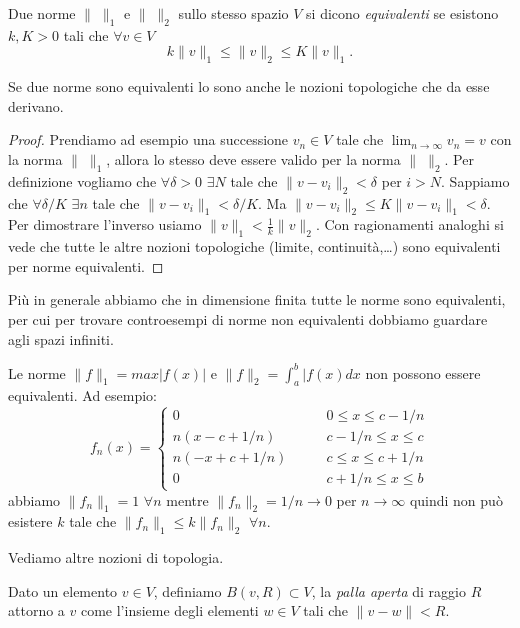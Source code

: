 \begin{definition}
Due norme $\|\;\|_1$ e $\|\;\|_2$ sullo stesso spazio $V$ si dicono \emph{equivalenti}
se esistono $k, K > 0$ tali che $\forall v \in V$ 
\[
	k\|v\|_1\leq \|v\|_2\leq K\|v\|_1
.\]
\end{definition}

\begin{lemma}
Se due norme sono equivalenti lo sono anche le nozioni topologiche che da
esse derivano.
\end{lemma}
\begin{proof}
Prendiamo ad esempio una successione $v_n\in V$ tale che
$\lim_{n\to \infty}v_n=v$ con la norma $\|\;\|_1$, allora lo stesso deve
essere valido per la norma $\|\;\|_2$. Per definizione vogliamo che
$\forall \delta>0$ $\exists N$ tale che $\|v-v_i\|_2<\delta$ per $i>N$.
Sappiamo che $\forall \delta/K$ $\exists n$ tale che $\|v-v_i\|_1<\delta/K$.
Ma $\|v-v_i\|_2\leq K\|v-v_i\|_1<\delta$. Per dimostrare l'inverso usiamo
$\|v\|_1<\frac{1}{k}\|v\|_2$.
Con ragionamenti analoghi si vede che tutte le altre nozioni topologiche
(limite, continuità,\ldots) sono equivalenti per norme equivalenti.
\end{proof}
Più in generale abbiamo che in dimensione finita tutte le norme sono
equivalenti, per cui per trovare controesempi di norme non equivalenti
dobbiamo guardare agli spazi infiniti.
\begin{example}
	
Le norme $\|f\|_1=max|f(x)|$ e $\|f\|_2=\int_{a}^b|f(x)dx$ non possono essere
equivalenti. Ad esempio:
\[
f_n(x)=\begin{cases}
0 \qquad &0 \leq x \leq c - 1/n\\
n(x-c+1/n) \qquad &c - 1/n \leq x \leq c\\
n(-x+c+1/n)\qquad &c \leq x \leq c + 1/n\\
0\qquad &c + 1/n \leq x \leq b
\end{cases}
\]
abbiamo $\|f_n\|_1=1$ $\forall n$ mentre $\|f_n\|_2=1/n\to 0$ per
$n\to \infty$ quindi non può esistere $k$ tale che
$\|f_n\|_1\leq k \|f_n\|_2$ $\forall n$.
\end{example}

Vediamo altre nozioni di topologia.\\
\begin{definition}
Dato un elemento $v \in V$, definiamo $B(v,R) \subset V$, la \emph{palla aperta}
di raggio $R$ attorno a $v$ come l'insieme degli elementi $w \in V$ tali
che $\|v-w\| < R$. 
\end{definition}

